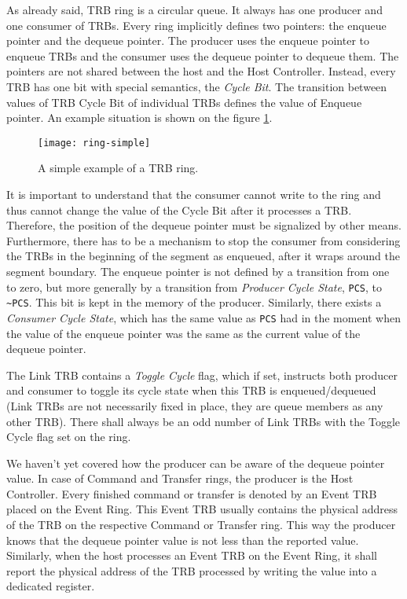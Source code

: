 As already said, TRB ring is a circular queue. It always has one producer and
one consumer of TRBs. Every ring implicitly defines two pointers: the enqueue
pointer and the dequeue pointer. The producer uses the enqueue pointer to
enqueue TRBs and the consumer uses the dequeue pointer to dequeue them. The
pointers are not shared between the host and the Host Controller. Instead,
every TRB has one bit with special semantics, the \emph{Cycle Bit}. The
transition between values of TRB Cycle Bit of individual TRBs defines the
value of Enqueue pointer. An example situation is shown on the figure
\ref{fig:ring-simple}.

\begin{figure}[h]
	\centering
	\texttt{[image: ring-simple]}
	\caption{A simple example of a TRB ring.}
	\label{fig:ring-simple}
\end{figure}

It is important to understand that the consumer cannot write to the ring and
thus cannot change the value of the Cycle Bit after it processes a TRB.
Therefore, the position of the dequeue pointer must be signalized by other
means. Furthermore, there has to be a mechanism to stop the consumer from
considering the TRBs in the beginning of the segment as enqueued, after it
wraps around the segment boundary. The enqueue pointer is not defined by
a transition from one to zero, but more generally by a transition from
\emph{Producer Cycle State}, \texttt{PCS}, to \texttt{\textasciitilde PCS}.
This bit is kept in the memory of the producer. Similarly, there exists
a \emph{Consumer Cycle State}, which has the same value as \texttt{PCS} had in
the moment when the value of the enqueue pointer was the same as the current
value of the dequeue pointer.

The Link TRB contains a \emph{Toggle Cycle} flag, which if set, instructs both
producer and consumer to toggle its cycle state when this TRB is
enqueued/dequeued (Link TRBs are not necessarily fixed in place, they are queue
members as any other TRB). There shall always be an odd number of Link TRBs
with the Toggle Cycle flag set on the ring.

We haven't yet covered how the producer can be aware of the dequeue pointer
value. In case of Command and Transfer rings, the producer is the Host
Controller. Every finished command or transfer is denoted by an Event TRB
placed on the Event Ring. This Event TRB usually contains the physical address
of the TRB on the respective Command or Transfer ring. This way the producer
knows that the dequeue pointer value is not less than the reported value.
Similarly, when the host processes an Event TRB on the Event Ring, it shall
report the physical address of the TRB processed by writing the value into
a dedicated register.

